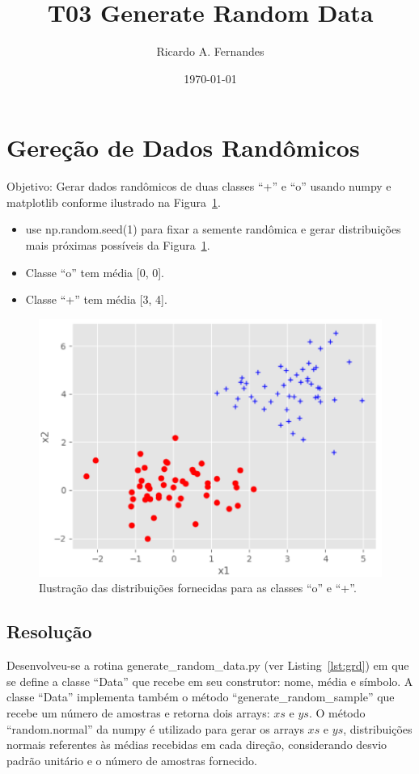 \documentclass[12pt, a4paper]{mycoursepaper}
\title{T03 Generate Random Data}
\author{Ricardo A. Fernandes}
\date{\today}
\begin{document}
\maketitle

\section{Gereção de Dados Randômicos}%
\vspace{-3mm}
Objetivo: Gerar dados randômicos de duas classes ``+'' e ``o'' usando numpy e matplotlib conforme ilustrado na Figura~\ref{fig:example}.
\vspace{-3mm}
\begin{itemize}
	\item use np.random.seed(1) para fixar a semente randômica e gerar distribuições mais próximas possíveis da Figura~\ref{fig:example}.
	\item Classe ``o'' tem média [0, 0].
	\item Classe ``+'' tem média [3, 4].
\end{itemize}
\vspace{-3mm}
\begin{figure}[H]
\centering
\includegraphics[width=0.45\paperwidth]{./example.png}
\caption{Ilustração das distribuições fornecidas para as classes ``o'' e ``+''.}
\label{fig:example}
\end{figure}

\newpage
\subsection{Resolução}
Desenvolveu-se a rotina generate\_random\_data.py (ver Listing~\ref{lst:grd}) em que se define a classe ``Data'' que recebe em seu construtor: nome, média e símbolo. A classe ``Data'' implementa também o método ``generate\_random\_sample'' que recebe um número de amostras e retorna dois arrays: $xs$ e $ys$. O método ``random.normal'' da numpy é utilizado para gerar os arrays $xs$ e $ys$, distribuições normais referentes às médias recebidas em cada direção, considerando desvio padrão unitário e o número de amostras fornecido.
\end{document}
